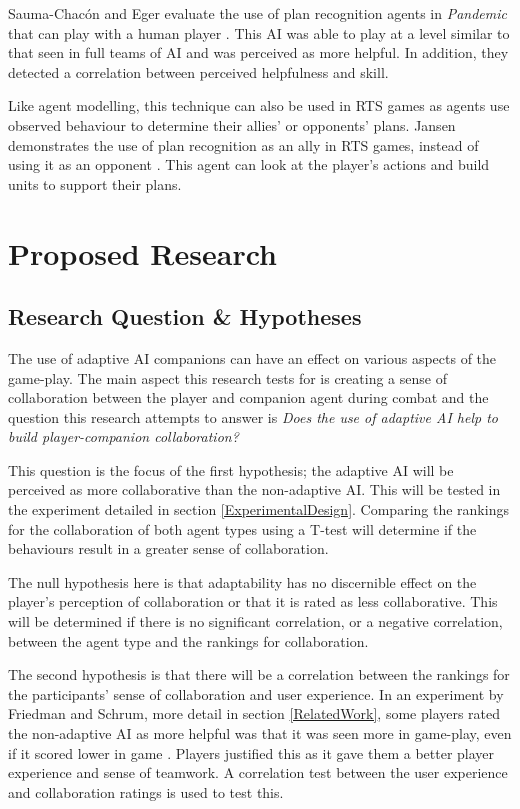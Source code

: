\documentclass{IEEEtran}
\begin{document}
Sauma-Chacón and Eger evaluate the use of plan recognition agents in \textit{Pandemic} that can play with a human player \cite{PandemicPlanRecognition2021}. This AI was able to play at a level similar to that seen in full teams of AI and was perceived as more helpful. In addition, they detected a correlation between perceived helpfulness and skill.

Like agent modelling, this technique can also be used in RTS games as agents use observed behaviour to determine their allies' or opponents' plans. Jansen demonstrates the use of plan recognition as an ally in RTS games, instead of using it as an opponent \cite{PlayerAdaptiveRTSAI2007}. This agent can look at the player's actions and build units to support their plans.

\section{Proposed Research}
\label{ProposedResearch}

\subsection{Research Question \& Hypotheses}
\label{Hypotheses}

The use of adaptive AI companions can have an effect on various aspects of the game-play. The main aspect this research tests for is creating a sense of collaboration between the player and companion agent during combat and the question this research attempts to answer is \textit{Does the use of adaptive AI help to build player-companion collaboration?}

This question is the focus of the first hypothesis; the adaptive AI will be perceived as more collaborative than the non-adaptive AI. This will be tested in the experiment detailed in section \ref{ExperimentalDesign}. Comparing the rankings for the collaboration of both agent types using a T-test will determine if the behaviours result in a greater sense of collaboration.

The null hypothesis here is that adaptability has no discernible effect on the player's perception of collaboration or that it is rated as less collaborative. This will be determined if there is no significant correlation, or a negative correlation, between the agent type and the rankings for collaboration.

The second hypothesis is that there will be a correlation between the rankings for the participants’ sense of collaboration and user experience. In an experiment by Friedman and Schrum, more detail in section \ref{RelatedWork}, some players rated the non-adaptive AI as more helpful was that it was seen more in game-play, even if it scored lower in game \cite{CompanionBotsFPS2019}. Players justified this as it gave them a better player experience and sense of teamwork. A correlation test between the user experience and collaboration ratings is used to test this.
\end{document}
